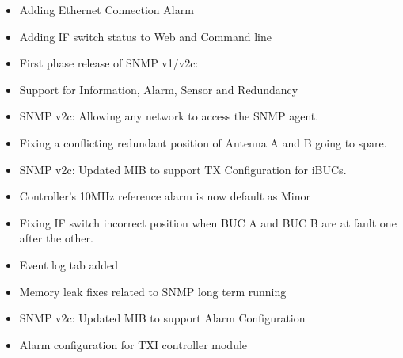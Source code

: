 \documentclass[letterpaper,10pt,english]{sphinxhowto}
\begin{document}
\begin{description}
\begin{itemize}
\end{itemize}

\begin{itemize}
\item {} 
\sphinxAtStartPar
Adding Ethernet Connection Alarm

\item {} 
\sphinxAtStartPar
Adding IF switch status to Web and Command line

\end{itemize}

\begin{itemize}
\item {} 
\sphinxAtStartPar
First phase release of SNMP v1/v2c:

\item {} 
\sphinxAtStartPar
Support for Information, Alarm, Sensor and Redundancy

\end{itemize}

\begin{itemize}
\item {} 
\sphinxAtStartPar
SNMP v2c: Allowing any network to access the SNMP agent.

\end{itemize}

\begin{itemize}
\item {} 
\sphinxAtStartPar
Fixing a conflicting redundant position of Antenna A and B going to spare.

\item {} 
\sphinxAtStartPar
SNMP v2c: Updated MIB to support TX Configuration for iBUCs.

\item {} 
\sphinxAtStartPar
Controller’s 10MHz reference alarm is now default as Minor

\end{itemize}

\begin{itemize}
\item {} 
\sphinxAtStartPar
Fixing IF switch incorrect position when BUC A and BUC B are at fault one after the other.

\item {} 
\sphinxAtStartPar
Event log tab added

\item {} 
\sphinxAtStartPar
Memory leak fixes related to SNMP long term running

\item {} 
\sphinxAtStartPar
SNMP v2c: Updated MIB to support Alarm Configuration

\item {} 
\sphinxAtStartPar
Alarm configuration for TXI controller module

\end{itemize}

\end{description}



\renewcommand{\indexname}{Index}
\printindex
\end{document}
